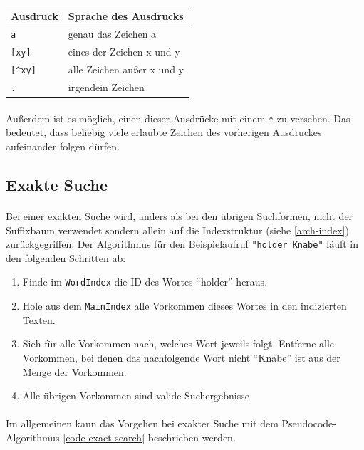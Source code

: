 \begin{tabularx}{\textwidth}{lX}
\hline
\textbf{Ausdruck} & \textbf{Sprache des Ausdrucks} \\ [0.1cm]
\hline
\texttt{a} & genau das Zeichen a \\ [0.1cm]
\hline
\texttt{[xy]} & eines der Zeichen x und y \\ [0.1cm]
\hline
\texttt{[\^{ }xy]} & alle Zeichen außer x und y \\ [0.1cm]
\hline
\texttt{.} & irgendein Zeichen \\ [0.1cm]
\hline
\end{tabularx}

\paragraph{} Außerdem ist es möglich, einen dieser Ausdrücke mit einem \texttt{*} zu versehen. Das bedeutet, dass beliebig viele erlaubte Zeichen des vorherigen Ausdruckes aufeinander folgen dürfen.

\subsection{Exakte Suche}
\label{algo-exact}

\paragraph{} Bei einer exakten Suche wird, anders als bei den übrigen Suchformen, nicht der Suffixbaum verwendet sondern allein auf die Indexstruktur (siehe \ref{arch-index}) zurückgegriffen. Der Algorithmus für den Beispielaufruf \texttt{"holder Knabe"} läuft in den folgenden Schritten ab:

\begin{enumerate}
\item Finde im \texttt{WordIndex} die ID des Wortes "`holder"' heraus.
\item Hole aus dem \texttt{MainIndex} alle Vorkommen dieses Wortes in den indizierten Texten.
\item Sieh für alle Vorkommen nach, welches Wort jeweils folgt. Entferne alle Vorkommen, bei denen das nachfolgende Wort nicht "`Knabe"' ist aus der Menge der Vorkommen.
\item Alle übrigen Vorkommen sind valide Suchergebnisse
\end{enumerate}

\paragraph{} Im allgemeinen kann das Vorgehen bei exakter Suche mit dem Pseudocode-Algorithmus \ref{code-exact-search} beschrieben werden.

